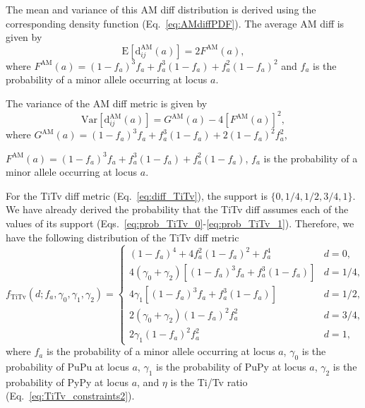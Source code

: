 \documentclass[aoas]{imsart}
\begin{document}
The mean and variance of this AM diff distribution is derived using the corresponding density function (Eq.~\ref{eq:AMdiffPDF}). The average AM diff is given by
%
\begin{equation}\label{eq:AMdiffMean}
\text{E}\left[\text{d}^\text{AM}_{ij}(a)\right] = 2 F^\text{AM}(a),
\end{equation}
%
where $F^\text{AM}(a) = \left(1 - f_a\right)^3 f_a + f^3_a \left(1 - f_a\right) + f^2_a \left(1 - f_a\right)^2$ and $f_a$ is the probability of a minor allele occurring at locus $a$.

The variance of the AM diff metric is given by
%
\begin{equation}\label{eq:AMdiffVar}
\text{Var}\left[\text{d}^\text{AM}_{ij}(a)\right] = G^\text{AM}(a) - 4 \left[F^\text{AM}(a)\right]^2,
\end{equation}
%
where $G^\text{AM}(a) = \left(1 - f_a\right)^3 f_a + f^3_a \left(1 - f_a\right) + 2\left(1 - f_a\right)^2 f^2_a$,

\noindent $F^\text{AM}(a) = \left(1 - f_a\right)^3 f_a + f^3_a \left(1 - f_a\right) + f^2_a \left(1 - f_a\right)$, $f_a$ is the probability of a minor allele occurring at locus $a$.

For the TiTv diff metric (Eq.~\ref{eq:diff_TiTv}), the support is $\{0,1/4,1/2,3/4,1\}$. We have already derived the probability that the TiTv diff assumes each of the values of its support (Eqs.~\ref{eq:prob_TiTv_0}-\ref{eq:prob_TiTv_1}). Therefore, we have the following distribution of the TiTv diff metric
%
\begin{equation}\label{eq:TiTvdiffPDF}
f_\text{TiTv}(d;f_a,\gamma_0,\gamma_1,\gamma_2) = \begin{cases}
\left(1 - f_a\right)^4 + 4 f^2_a \left(1 - f_a\right)^2 + f^4_a & d=0, \\
4(\gamma_0 + \gamma_2)\left[\left(1 - f_a\right)^3 f_a + f^3_a \left(1 - f_a\right)\right] & d=1/4, \\
4 \gamma_1 \left[\left(1 - f_a\right)^3 f_a + f^3_a \left(1 - f_a\right)\right] & d=1/2, \\
2(\gamma_0 + \gamma_2)\left(1 - f_a\right)^2 f^2_a & d=3/4, \\
2\gamma_1\left(1 - f_a\right)^2 f^2_a & d=1,
\end{cases}
\end{equation}
%
where $f_a$ is the probability of a minor allele occurring at locus $a$, $\gamma_0$ is the probability of PuPu at locus $a$, $\gamma_1$ is the probability of PuPy at locus $a$, $\gamma_2$ is the probability of PyPy at locus $a$, and $\eta$ is the Ti/Tv ratio (Eq.~\ref{eq:TiTv_constraints2}).
\end{document}
